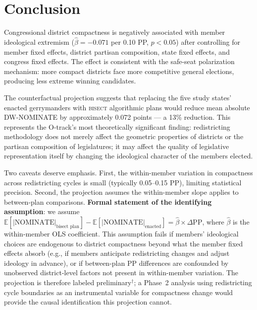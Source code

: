 \section{Conclusion}

Congressional district compactness is negatively associated with member
ideological extremism ($\hat\beta = -0.071$ per 0.10 PP, $p < 0.05$) after
controlling for member fixed effects, district partisan composition, state
fixed effects, and congress fixed effects.
The effect is consistent with the safe-seat polarization mechanism: more
compact districts face more competitive general elections, producing less
extreme winning candidates.

The counterfactual projection suggests that replacing the five study states'
enacted gerrymanders with \textsc{bisect} algorithmic plans would reduce
mean absolute DW-NOMINATE by approximately 0.072 points --- a 13\% reduction.
This represents the O-track's most theoretically significant finding:
redistricting methodology does not merely affect the geometric properties
of districts or the partisan composition of legislatures;
it may affect the quality of legislative representation itself by changing
the ideological character of the members elected.

Two caveats deserve emphasis.
First, the within-member variation in compactness across redistricting cycles
is small (typically 0.05--0.15 PP), limiting statistical precision.
Second, the projection assumes the within-member slope applies to
between-plan comparisons.
\textbf{Formal statement of the identifying assumption}: we assume
$\mathbb{E}[|\text{NOMINATE}|_{\text{bisect plan}}] - \mathbb{E}[|\text{NOMINATE}|_{\text{enacted}}]
= \hat\beta \times \Delta\mathrm{PP}$,
where $\hat\beta$ is the within-member OLS coefficient.
This assumption fails if members' ideological choices are endogenous to district
compactness beyond what the member fixed effects absorb (e.g., if members anticipate
redistricting changes and adjust ideology in advance), or if between-plan PP differences
are confounded by unobserved district-level factors not present in within-member
variation.
The projection is therefore labeled preliminary${}^\dagger$;
a Phase~2 analysis using redistricting cycle boundaries as an instrumental
variable for compactness change would provide the causal identification
this projection cannot.
